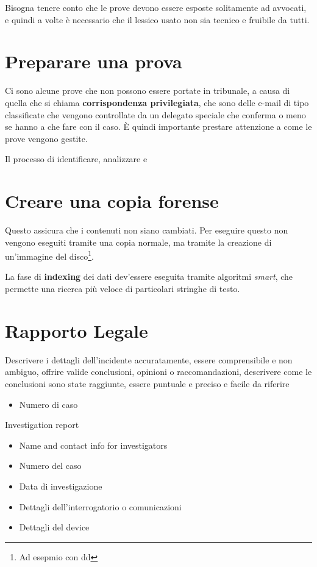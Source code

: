Bisogna tenere conto che le prove devono essere esposte solitamente ad avvocati,
e quindi a volte è necessario che il lessico usato non sia tecnico e fruibile da
tutti.

\section{Preparare una prova}

Ci sono alcune prove che non possono essere portate in tribunale, a causa di
quella che si chiama \textbf{corrispondenza privilegiata}, che sono delle e-mail
di tipo classificate che vengono controllate da un delegato speciale che
conferma o meno se hanno a che fare con il caso. È quindi importante prestare
attenzione a come le prove vengono gestite.


Il processo di identificare, analizzare e 

\section{Creare una copia forense}

Questo assicura che i contenuti non siano cambiati. Per eseguire questo non
vengono eseguiti tramite una copia normale, ma tramite la creazione di
un'immagine del disco\footnote{Ad esepmio con dd}.

La fase di \textbf{indexing} dei dati dev'essere eseguita tramite algoritmi
\textit{smart}, che permette una ricerca più veloce di particolari stringhe di
testo.

\section{Rapporto Legale}

Descrivere i dettagli dell'incidente accuratamente, essere comprensibile e non
ambiguo, offrire valide conclusioni, opinioni o raccomandazioni, descrivere come
le conclusioni sono state raggiunte, essere puntuale e preciso e facile da
riferire



\begin{itemize}
\item Numero di caso

\end{itemize}

Investigation report
\begin{itemize}
\item Name and contact info for investigators
\item Numero del caso
\item Data di investigazione
\item Dettagli dell'interrogatorio o comunicazioni
\item Dettagli del device

\end{itemize}


